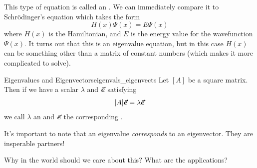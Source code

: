         This type of equation is called an .  We can immediately compare it to Schr\"odinger's equation which takes the form
        \[
        H(x)\Psi(x) = E\Psi(x)
        \]
        where $H(x)$ is the Hamiltonian, and $E$ is the energy value for the wavefunction $\Psi(x)$.  It turns out that this is an eigenvalue equation, but in this case $H(x)$ can be something other than a matrix of constant numbers (which makes it more complicated to solve).
        
        \begin{df}{Eigenvalues and Eigenvectors}{eigenvals_eigenvects}
        Let $[A]$ be a square matrix.  Then if we have a scalar $\lambda$ and $\boldsymbol{\vec{e}}$ satisfying
        \[
        [A]\boldsymbol{\vec{e}}=\lambda \boldsymbol{\vec{e}}
        \]
        we call $\lambda$ an  and $\boldsymbol{\vec{e}}$ the corresponding .
        \end{df}
        
        \begin{remark}
            It's important to note that an eigenvalue \emph{corresponds} to an eigenvector.  They are insperable partners! 
        \end{remark}
        
        \begin{question}
        Why in the world should we care about this? What are the applications? 
        \end{question}
        
